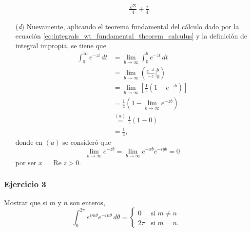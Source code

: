\documentclass[a4paper]{report}
\renewcommand{\Re}{\operatorname{Re}}
\begin{document}
\begin{enumerate}
\begin{align*}
   &=\frac{\sqrt{3}}{4}+\frac{i}{4}.
 \end{align*}
 \item[(\textit{d})] Nuevamente, aplicando el teorema fundamental del cálculo dado por la ecuación \ref{eq:integrals_wt_fundamental_theorem_calculus} y la definición de integral impropia, se tiene que 
 \begin{align*}
  \int_0^\infty e^{-zt}\,dt&=\lim_{b\to\infty}\int_0^b e^{-zt}\,dt\\
   &=\lim_{b\to\infty}\left(\frac{e^{-zt}}{-z}\bigg|_0^b\right)\\
   &=\lim_{b\to\infty}\left[\frac{1}{z}\left(1-e^{-zb}\right)\right]\\
   &=\frac{1}{z}\left(1-\lim_{b\to\infty}e^{-zb}\right)\\
   &\overset{(a)}{=}\frac{1}{z}\left(1-0\right)\\
   &=\frac{1}{z},
 \end{align*}
donde en \((a)\) se consideró que 
\[
 \lim_{b\to\infty}e^{-zb}=\lim_{b\to\infty}e^{-xb}e^{-iyb}=0
\]
por ser \(x=\Re z>0\).
\end{enumerate}

  
\subsubsection{Ejercicio 3} 
 
Mostrar que si \(m\) y \(n\) son enteros,
\[
 \int_0^{2\pi}e^{im\theta}e^{-in\theta}\,d\theta=
 \left\{ 
 \begin{array}{ll}
  0 & \textrm{si }m\neq n\\
  2\pi & \textrm{si }m=n.
 \end{array}
 \right.
\]
\end{document}

